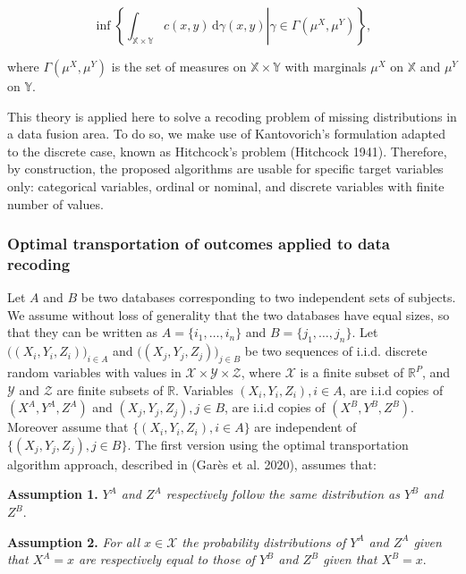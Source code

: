 \begin{equation}
  \inf\left\{\left. \int_{{\mathbb{X}} \times {\mathbb{Y}}} c(x, y) \, \mathrm{d} \gamma (x,y) \right| \gamma \in \Gamma(\mu^X,\mu^Y) \right\},
\label{eq:kanto1}
\end{equation}

where \(\Gamma(\mu^X,\mu^Y)\) is the set of measures on \(\mathbb{X} \times \mathbb{Y}\) with marginals \(\mu^X\) on \(\mathbb{X}\) and \(\mu^Y\) on \(\mathbb{Y}\).

This theory is applied here to solve a recoding problem of missing distributions in a data fusion area. To do so, we make use of Kantovorich's formulation adapted to the discrete case, known as Hitchcock's problem (Hitchcock 1941). Therefore, by construction, the proposed algorithms are usable for specific target variables only: categorical variables, ordinal or nominal, and discrete variables with finite number of values.

\hypertarget{optt}{%
\subsubsection{Optimal transportation of outcomes applied to data recoding}\label{optt}}

Let \(A\) and \(B\) be two databases corresponding to two independent sets of subjects.
We assume without loss of generality that the two databases have equal sizes, so that they can be written as \(A=\{i_1,\dots,i_{n}\}\) and \(B=\{j_1,\dots,j_{n}\}\). Let \(\big((X_i,Y_i,Z_i)\big)_{i\in A}\) and \(\big((X_j,Y_j,Z_j)\big)_{j\in B}\) be two sequences of i.i.d. discrete random variables with values in \(\mathcal{X} \times \mathcal{Y} \times \mathcal{Z}\), where \(\mathcal{X}\) is a finite subset of \(\mathbb{R}^P\), and \(\mathcal{Y}\) and \(\mathcal{Z}\) are finite subsets of \(\mathbb{R}\). Variables \((X_i,Y_i,Z_i), i\in A\), are i.i.d copies of \((X^A,Y^A,Z^A)\) and \((X_j,Y_j,Z_j), j\in B\), are i.i.d copies of \((X^B,Y^B,Z^B)\). Moreover assume that \(\big\{(X_i,Y_i,Z_i),i\in A\big\}\) are independent of \(\big\{(X_j,Y_j,Z_j),j\in B\big\}\).
The first version using the optimal transportation algorithm approach, described in (Garès et al. 2020), assumes that:

\textbf{Assumption 1.} \emph{\(Y^A\) and \(Z^A\) respectively follow the same distribution as \(Y^B\) and \(Z^B\)}.

\textbf{Assumption 2.} \emph{For all \(x \in \mathcal{X}\) the probability distributions of \(Y^A\) and \(Z^A\) given that \(X^A= x\) are respectively equal to those of \(Y^B\) and \(Z^B\) given that \(X^B= x\)}.

